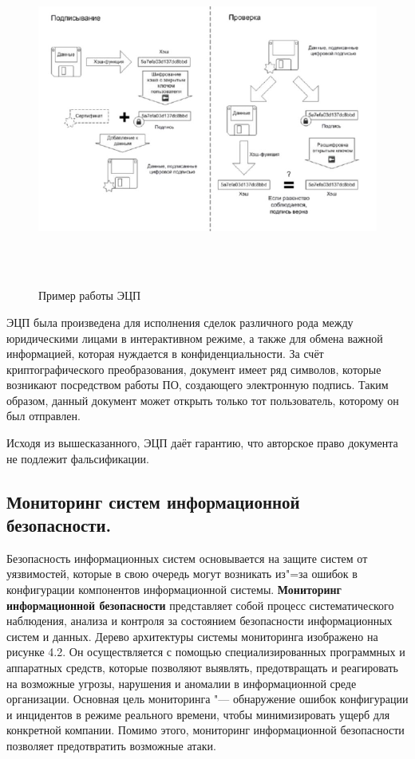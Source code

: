     \begin{figure}[H]
        \centering
        \includegraphics[height = 11cm, width = 14cm]{pic/legit_doc.png}
        \caption{Пример работы ЭЦП}
    \end{figure}

    ЭЦП была произведена для исполнения сделок различного рода между юридическими лицами в интерактивном режиме,
    а также для обмена важной информацией, которая нуждается в конфиденциальности. За счёт криптографического преобразования,
    документ имеет ряд символов, которые возникают посредством работы ПО, создающего электронную подпись. Таким образом, данный документ
    может открыть только тот пользователь, которому он был отправлен.

    Исходя из вышесказанного, ЭЦП даёт гарантию, что авторское право документа не подлежит фальсификации\cite{crypto}.

\newpage
\subsection{Мониторинг систем информационной безопасности.}
    Безопасность информационных систем основывается на защите систем от уязвимостей, которые в свою очередь могут возникать из"=за
    ошибок в конфигурации компонентов информационной системы. \textbf{Мониторинг информационной безопасности} представляет собой процесс систематического 
    наблюдения, анализа и контроля за состоянием безопасности информационных систем и данных. Дерево архитектуры системы мониторинга изображено на рисунке 4.2. Он осуществляется с помощью специализированных программных и 
    аппаратных средств, которые позволяют выявлять, предотвращать и реагировать на возможные угрозы, нарушения и аномалии в информационной среде организации.
    Основная цель мониторинга "--- обнаружение ошибок конфигурации и инцидентов в режиме реального времени, чтобы минимизировать ущерб для конкретной компании.
    Помимо этого, мониторинг информационной безопасности позволяет предотвратить возможные атаки.

